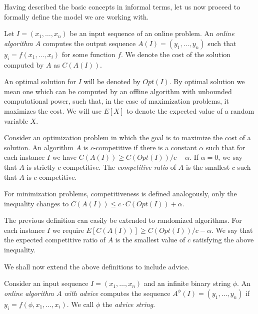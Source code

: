 Having described the basic concepts in informal terms, let us now proceed
to formally define the model we are working with.

\begin{definition}\label{def:online-algorithm}
    Let $I = (x_1, \dots, x_n)$ be an input sequence of an online problem.
    An \emph{online algorithm} $A$ computes the output sequence $A(I) =
    (y_1, \dots, y_n)$ such that $y_i = f(x_1, \dots, x_i)$ for some
    function $f$. We denote the cost of the solution computed by $A$ as
    $C(A(I))$.
\end{definition}

An optimal solution for $I$ will be denoted by $Opt(I)$. By optimal
solution we mean one which can be computed by an offline algorithm with
unbounded computational power, such that, in the case of maximization
problems, it maximizes the cost. We will use $E[X]$ to denote the expected
value of a random variable $X$.

\begin{definition}\label{def:competitive-ratio}
    Consider an optimization problem in which the goal is to maximize the
    cost of a solution. An algorithm $A$ is $c$-competitive if there is a
    constant $\alpha$ such that for each instance $I$ we have $C(A(I))
    \geq C(Opt(I)) / c - \alpha$. If $\alpha = 0$, we say that $A$ is
    strictly $c$-competitive. The \emph{competitive ratio} of $A$ is the
    smallest $c$ such that $A$ is $c$-competitive.
\end{definition}

For minimization problems, competitiveness is defined analogously, only
the inequality changes to $C(A(I)) \leq c \cdot C(Opt(I)) + \alpha$.

The previous definition can easily be extended to randomized algorithms.
For each instance $I$ we require $E[C(A(I))] \geq C(Opt(I)) / c -
\alpha$. We say that the expected competitive ratio of $A$ is the smallest
value of $c$ satisfying the above inequality.

We shall now extend the above definitions to include advice.

\begin{definition}\label{def:online-advice}
    Consider an input sequence $I = (x_1, \dots, x_n)$ and an infinite
    binary string $\phi$.  An \emph{online algorithm $A$ with advice}
    computes the sequence $A^\phi(I) = (y_1, \dots, y_n)$ if $y_i =
    f(\phi, x_1, \dots, x_i)$. We call $\phi$ the \emph{advice string}.
\end{definition}

